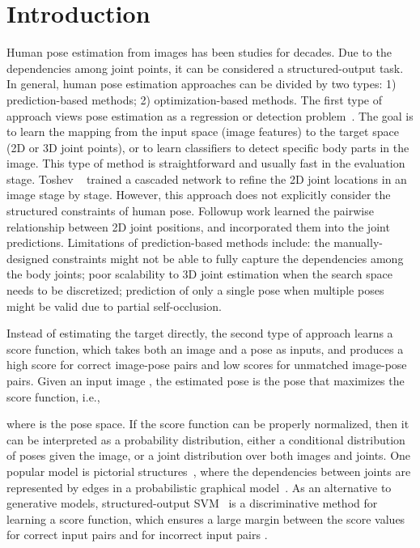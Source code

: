 \documentclass[10pt,twocolumn,letterpaper]{article}
\begin{document}
\section{Introduction}
Human pose estimation from images has been studies for decades. 
Due to the dependencies among joint points, it can be considered a structured-output task.
In general, human pose estimation approaches can be divided by two types: 1) prediction-based methods; 2) optimization-based methods.
The first type of approach views pose estimation as a regression or detection problem~\cite{accv2014, deeppose2014,hmlpeijcv,Jonathan2014,arjun2014iclr}. 
The goal is to learn the mapping from the input space (image features) to the target space (2D or 3D joint points), or to learn classifiers to detect specific body parts in the image. 
This type of method is straightforward and usually fast in the evaluation stage. 
Toshev \etal~\cite{deeppose2014} trained a cascaded network to refine the 2D joint locations in an image stage by stage. 
However, this approach does not explicitly consider the structured constraints of human pose.
Followup work \cite{arjun2014iclr,Jonathan2014} learned the pairwise relationship between 2D joint positions, and incorporated them into the joint predictions.
Limitations of prediction-based methods include:
the manually-designed constraints might not be able to fully capture the dependencies among the body joints; poor scalability to 3D joint estimation when the search space needs to be discretized; prediction of only a single pose when multiple poses might be valid due to partial self-occlusion.
 
Instead of estimating the target directly, the second type of approach
learns a score function, which takes both an image and a pose as inputs,  
and produces a high score for correct image-pose pairs and low scores for 
unmatched image-pose pairs.
Given an input image , the estimated pose 
is the pose that
maximizes the score function, i.e., 
 
where  is the pose space.
If the score function can be properly normalized, then it can be interpreted as a probability distribution, 
either a conditional distribution of poses given the image, or a joint distribution over both images and joints. 
One popular model is pictorial structures~\cite{Felzenszwalb05}, where the dependencies between joints are represented by edges in a probabilistic graphical model~\cite{pgm2009}.
As an alternative to generative models, structured-output SVM~\cite{structsvm2004} 
is a discriminative method for learning a score function, which ensures a large margin between the score values for correct input pairs and for incorrect input pairs
\cite{labelembed2013,Catalin2009}.
\end{document}
